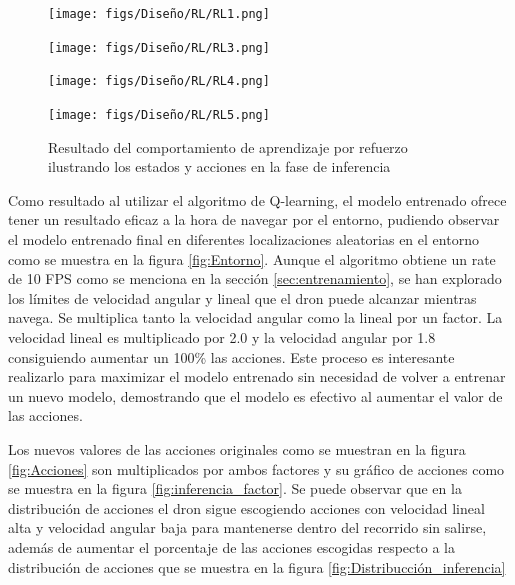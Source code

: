 \begin{figure}[H]
  \centering
  \begin{minipage}{0.3\textwidth}
    \texttt{[image: figs/Diseño/RL/RL1.png]}
  \end{minipage}
  \hfill
  \begin{minipage}{0.3\textwidth}
    \texttt{[image: figs/Diseño/RL/RL3.png]}
  \end{minipage}
  \hfill
  \begin{minipage}{0.3\textwidth}
    \texttt{[image: figs/Diseño/RL/RL4.png]}
  \end{minipage}
  \hfill
  \begin{minipage}{0.3\textwidth}
    \texttt{[image: figs/Diseño/RL/RL5.png]}
  \end{minipage}
  \caption{Resultado del comportamiento de aprendizaje por refuerzo ilustrando los estados y acciones en la fase de inferencia}
  \label{fig:inferencia-imagenes}
  \vspace{-1.5em}
\end{figure}

Como resultado al utilizar el algoritmo de Q-learning, el modelo entrenado ofrece tener un resultado eficaz a la hora de navegar por el entorno, pudiendo observar 
el modelo entrenado final en diferentes localizaciones aleatorias en el entorno como se muestra en la figura \ref{fig:Entorno}. 
Aunque el algoritmo obtiene un rate de 10 FPS como se menciona en la sección \ref{sec:entrenamiento}, se han explorado los límites de velocidad angular y lineal que el dron puede alcanzar mientras navega. Se multiplica tanto la velocidad angular como la lineal
por un factor. La velocidad lineal es multiplicado por 2.0 y la velocidad angular por 1.8 consiguiendo aumentar un 100\% las acciones. Este proceso es interesante realizarlo para 
maximizar el modelo entrenado sin necesidad de volver a entrenar un nuevo modelo, demostrando que el modelo es efectivo al aumentar el valor de las acciones.

Los nuevos
valores de las acciones originales como se muestran en la figura \ref{fig:Acciones} son multiplicados por ambos factores
y su gráfico de acciones como se muestra en la figura \ref{fig:inferencia_factor}. Se puede observar que en la distribución de acciones el dron
sigue escogiendo acciones con velocidad lineal alta y velocidad angular baja para mantenerse dentro del recorrido sin salirse, además de aumentar el porcentaje de las acciones escogidas respecto a la distribución de acciones
que se muestra en la figura \ref{fig:Distribucción_inferencia}

